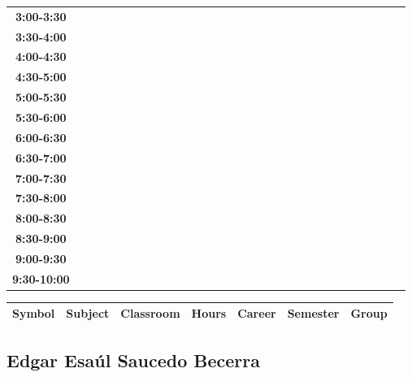 \documentclass{article}
\begin{document}
\begin{table}[ht]
\begin{tabular}{|c|c|c|c|c|c|c|c|c|c|c|c|c|c|c|c|c|c|c|c|c|c|c|c|c|c|c|c|c|c|}
 \cline{1-8} 
\textbf{3:00-3:30} &   &   &   &   &   &   &   \\
 \cline{1-8} 
\textbf{3:30-4:00} &   &   &   &   &   &   &   \\
 \cline{1-8} 
\textbf{4:00-4:30} &   &   &   &   &   &   &   \\
 \cline{1-8} 
\textbf{4:30-5:00} &   &   &   &   &   &   &   \\
 \cline{1-8} 
\textbf{5:00-5:30} &   &   &   &   &   &   &   \\
 \cline{1-8} 
\textbf{5:30-6:00} &   &   &   &   &   &   &   \\
 \cline{1-8} 
\textbf{6:00-6:30} &   &   &   &   &   &   &   \\
 \cline{1-8} 
\textbf{6:30-7:00} &   &   &   &   &   &   &   \\
 \cline{1-8} 
\textbf{7:00-7:30} &   &   &   &   &   &   &   \\
 \cline{1-8} 
\textbf{7:30-8:00} &   &   &   &   &   &   &   \\
 \cline{1-8} 
\textbf{8:00-8:30} &   &   &   &   &   &   &   \\
 \cline{1-8} 
\textbf{8:30-9:00} &   &   &   &   &   &   &   \\
 \cline{1-8} 
\textbf{9:00-9:30} &   &   &   &   &   &   &   \\
 \cline{1-8} 
\textbf{9:30-10:00} &   &   &   &   &   &   &   \\
 \cline{1-8} 
\end{tabular}\end{table}

        
        \begin{tabular}{|>{\centering\arraybackslash}m{2cm}|>{\centering\arraybackslash}m{4cm}|>{\centering\arraybackslash}m{2cm}|>{\centering\arraybackslash}m{2cm}|>{\centering\arraybackslash}m{2cm}|>{\centering\arraybackslash}m{2cm}|>{\centering\arraybackslash}m{2cm}|}
        \hline
        \textbf{Symbol} & \textbf{Subject} & \textbf{Classroom} & \textbf{Hours} & \textbf{Career} & \textbf{Semester} & \textbf{Group} \\
        \hline
        \end{tabular}
                    

        \newpage
        

        \subsection{Edgar Esa\'ul Saucedo Becerra}
        \vspace*{.1cm}
        
\end{document}

